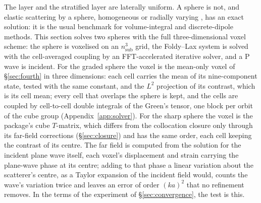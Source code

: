 \documentclass[preprint,review,12pt]{elsarticle}
\begin{document}
The layer and the stratified layer are laterally uniform. A sphere is not, and elastic scattering by a
sphere, homogeneous \citep{YingTruell1956,PaoMow1973} or radially varying \citep{TakeuchiSaito1972},
has an exact solution: it is the usual benchmark for volume-integral and discrete-dipole methods. This
section solves two spheres with the full three-dimensional voxel scheme: the sphere is voxelised on an
$n_{\mathrm{sub}}^3$ grid, the Foldy--Lax system is solved with the cell-averaged coupling by an
FFT-accelerated iterative solver, and a P wave is incident. For the graded sphere the voxel is the
mean-only voxel of \S\ref{sec:fourth} in three dimensions: each cell carries the mean of its
nine-component state, tested with the same constant, and the $L^2$ projection of its contrast, which is
its cell mean; every cell that overlaps the sphere is kept, and the cells are coupled by cell-to-cell
double integrals of the Green's tensor, one block per orbit of the cube group
(Appendix~\ref{app:solver}). For the sharp sphere the voxel is the package's cube $T$-matrix, which
differs from the collocation closure only through its far-field corrections (\S\ref{sec:closure}) and
has the same order, each cell keeping the contrast of its centre. The far field is
computed from the solution for the incident plane wave itself, each voxel's displacement and strain
carrying the plane-wave phase at its centre; adding to that phase a linear variation about the
scatterer's centre, as a Taylor expansion of the incident field would, counts the wave's variation
twice and leaves an error of order $(ka)^2$ that no refinement removes. In the terms of the experiment of \S\ref{sec:convergence}, the test is this.
\end{document}
